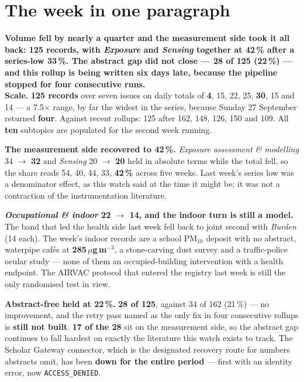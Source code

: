 \documentclass[10pt]{article}
\begin{document}
\vspace{6mm}

\section*{\sffamily\bfseries\color{Deep}The week in one paragraph}
\vspace{-1.5mm}{\color{Teal}\rule{\linewidth}{1.1pt}}\vspace{2.5mm}

\begin{keybox}
{\sffamily\bfseries\small\color{Deep}Volume fell by nearly a quarter and the measurement side took it
all back: 125 records, with \textit{Exposure} and \textit{Sensing} together at 42\,\% after a series-low
33\,\%. The abstract gap did not close --- 28 of 125 (22\,\%) --- and this rollup is being written six days
late, because the pipeline stopped for four consecutive runs.}\\[1.4mm]
\footnotesize
\textbf{Scale.} \textbf{125 records} over seven issues on daily totals of \textbf{4}, 15, 22, 25,
\textbf{30}, 15 and 14 --- a 7.5$\times$ range, by far the widest in the series, because Sunday
27 September returned \textbf{four}. Against recent rollups: 125 after 162, 148, 126, 150 and 109. All
\textbf{ten} subtopics are populated for the second week running.

\textbf{The measurement side recovered to 42\,\%.} \textit{Exposure assessment \& modelling} 34
$\rightarrow$ \textbf{32} and \textit{Sensing} 20 $\rightarrow$ \textbf{20} held in absolute terms while
the total fell, so the share reads 54, 40, 44, 33, \textbf{42\,\%} across five weeks. Last week's
series low was a denominator effect, as this watch said at the time it might be; it was not a contraction
of the instrumentation literature.

\textbf{\textit{Occupational \& indoor} 22 $\rightarrow$ 14, and the indoor turn is still a model.}
The band that led the health side last week fell back to joint second with \textit{Burden} (14 each).
The week's indoor records are a school PM$_{10}$ deposit with no abstract, waterpipe caf\'es at
\textbf{285\,$\mu$g\,m$^{-3}$}, a stone-carving dust survey and a traffic-police ocular study --- none of
them an occupied-building intervention with a health endpoint. The AIRVAC protocol that entered the
registry last week is still the only randomised test in view.

\textbf{Abstract-free held at 22\,\%.} \textbf{28 of 125}, against 34 of 162 (21\,\%) --- no improvement,
and the retry pass named as the only fix in four consecutive rollups is \textbf{still not built}.
\textbf{17 of the 28} sit on the measurement side, so the abstract gap continues to fall hardest on
exactly the literature this watch exists to track. The Scholar Gateway connector, which is the
designated recovery route for numbers abstracts omit, has been \textbf{down for the entire period} ---
first with an identity error, now \texttt{ACCESS\_DENIED}.


\end{keybox}
\end{document}
